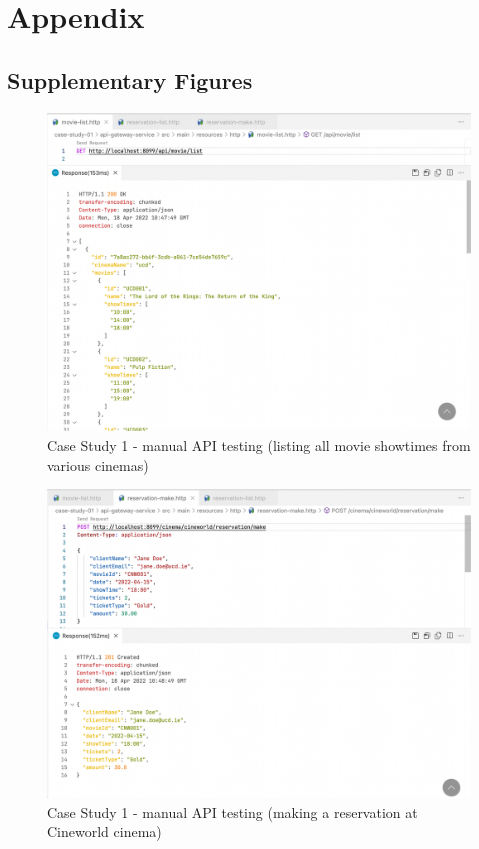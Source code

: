 \chapter{Appendix}

\section{Supplementary Figures}


\begin{figure}[H]
  \centering
  \includegraphics[width=1.0\linewidth]{./assets/images/case-studies/cs01-manual-1.png}
  \caption{Case Study 1 - manual API testing (listing all movie showtimes from various cinemas)}
  \label{fig:cs01-manual-1}
\end{figure}

\begin{figure}[H]
  \centering
  \includegraphics[width=1.0\linewidth]{./assets/images/case-studies/cs01-manual-2.png}
  \caption{Case Study 1 - manual API testing (making a reservation at Cineworld cinema)}
  \label{fig:cs01-manual-2}
\end{figure}

